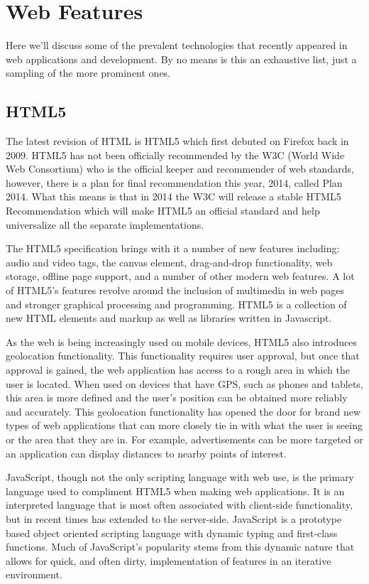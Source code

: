 \documentclass[12pt]{ucthesis}
\begin{document}
\section{Web Features}
Here we'll discuss some of the prevalent technologies that recently appeared in web applications and development. By no means is this an exhaustive list, just a sampling of the more prominent ones.

\subsection{HTML5}
The latest revision of HTML is HTML5 which first debuted on Firefox back in 2009\cite{EvolutionOfWeb}. HTML5 has not been officially recommended by the W3C (World Wide Web Consortium) who is the official keeper and recommender of web standards, however, there is a plan for final recommendation this year, 2014, called Plan 2014\cite{Plan2014}. What this means is that in 2014 the W3C will release a stable HTML5 Recommendation which will make HTML5 an official standard and help universalize all the separate implementations.

The HTML5 specification brings with it a number of new features including: audio and video tags, the canvas element, drag-and-drop functionality, web storage, offline page support, and a number of other modern web features. A lot of HTML5's features revolve around the inclusion of multimedia in web pages and stronger graphical processing and programming. HTML5 is a collection of new HTML elements and markup as well as libraries written in Javascript.

As the web is being increasingly used on mobile devices, HTML5 also introduces geolocation functionality. This functionality requires user approval, but once that approval is gained, the web application has access to a rough area in which the user is located. When used on devices that have GPS, such as phones and tablets, this area is more defined and the user's position can be obtained more reliably and accurately. This geolocation functionality has opened the door for brand new types of web applications that can more closely tie in with what the user is seeing or the area that they are in. For example, advertisements can be more targeted or an application can display distances to nearby points of interest.

JavaScript, though not the only scripting language with web use, is the primary language used to compliment HTML5 when making web applications. It is an interpreted language that is most often associated with client-side functionality, but in recent times has extended to the server-side. JavaScript is a prototype based object oriented scripting language with dynamic typing and first-class functions. Much of JavaScript's popularity stems from this dynamic nature that allows for quick, and often dirty, implementation of features in an iterative environment.
\end{document}
